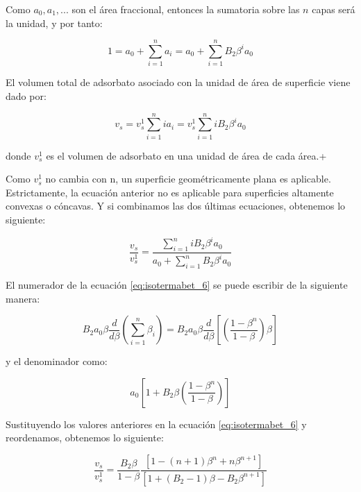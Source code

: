 \documentclass[11pt]{book}
\begin{document}
Como $a_0, a_1, ...$ son el área fraccional, entonces la sumatoria sobre las $n$ capas será la unidad, y por tanto:

\begin{equation}
    1 = a_0 + \sum_{i=1}^{n} a_i = a_0 + \sum_{i=1}^{n} B_2 \beta^i a_0
\end{equation}

El volumen total de adsorbato asociado con la unidad de área de superficie viene dado por:

\begin{equation}
    v_s = v_s^1 \sum_{i=1}^{n} i a_i = v_s^1 \sum_{i=1}^{n} i B_2 \beta^i a_0
\end{equation}

donde $v_s^1$ es el volumen de adsorbato en una unidad de área de cada área.+

Como $v_s^1$ no cambia con n, un superficie geométricamente plana es aplicable. Estrictamente, la ecuación anterior no es aplicable para superficies altamente convexas o cóncavas. Y si combinamos las dos últimas ecuaciones, obtenemos lo siguiente:

\begin{equation}
   \label{eq:isotermabet_6}
    \frac{v_s}{v_s^1} = \frac{\sum_{i=1}^{n} i B_2 \beta^i a_0 }{a_0 + \sum_{i=1}^{n} B_2 \beta^i a_0}
\end{equation}

El numerador de la ecuación \ref{eq:isotermabet_6} se puede escribir de la siguiente manera:

\begin{equation*}
    B_2 a_0 \beta \frac{d}{d\beta} \left( \sum_{i = 1}^{n} \beta_i \right) = B_2 a_0 \beta \frac{d}{d\beta} \left[ \left(\frac{1-\beta^n}{1-\beta} \right) \beta \right]
\end{equation*}

y el denominador como:

\begin{equation*}
    a_0 \left[ 1 + B_2 \beta \left( \frac{1-\beta^n}{1-\beta} \right) \right]
\end{equation*}

Sustituyendo los valores anteriores en la ecuación \ref{eq:isotermabet_6} y reordenamos, obtenemos lo siguiente:

\begin{equation}
    \label{eq:isotermabet_7}
    \frac{v_s}{v_s^1} = \frac{B_2 \beta}{1-\beta} \frac{\left[ 1 - (n+1)\beta^n + n\beta^{n+1} \right]}{\left[ 1 + (B_2-1)\beta - B_2\beta^{n+1} \right]}
\end{equation}
\end{document}
